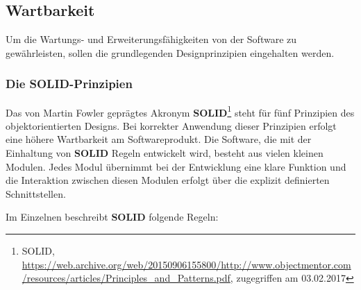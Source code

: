 \subsection{Wartbarkeit}\label{maintenance}

Um die Wartungs- und Erweiterungsfähigkeiten von der Software zu gewährleisten, sollen die grundlegenden Designprinzipien eingehalten werden.

\subsubsection{Die SOLID-Prinzipien}\label{solid}

Das von Martin Fowler geprägtes Akronym \textbf{SOLID}\footnote{SOLID, \url{https://web.archive.org/web/20150906155800/http://www.objectmentor.com/resources/articles/Principles_and_Patterns.pdf}, zugegriffen am 03.02.2017} steht für fünf Prinzipien des objektorientierten Designs. Bei korrekter Anwendung dieser Prinzipien erfolgt eine höhere Wartbarkeit am Softwareprodukt. Die Software, die mit der Einhaltung von \textbf{SOLID} Regeln entwickelt wird, besteht aus vielen kleinen Modulen. Jedes Modul übernimmt bei der Entwicklung eine klare Funktion und die Interaktion zwischen diesen Modulen erfolgt über die explizit definierten Schnittstellen.

Im Einzelnen beschreibt \textbf{SOLID} folgende Regeln:

